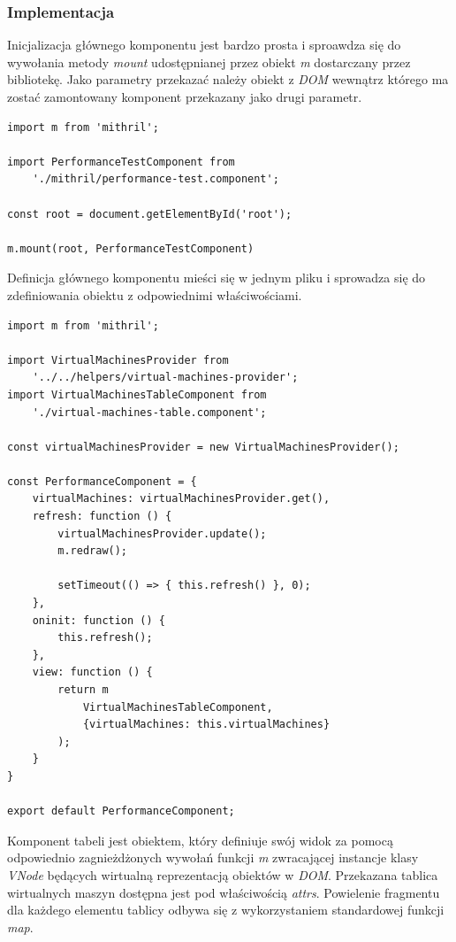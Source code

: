 \documentclass[polish, twoside, 12pt]{mwart}
\begin{document}
\subsubsection{Implementacja}

Inicjalizacja głównego komponentu jest bardzo prosta i sproawdza się do wywołania metody \emph{mount} udostępnianej przez obiekt \emph{m} dostarczany przez bibliotekę. Jako parametry przekazać należy obiekt z \emph{DOM} wewnątrz którego ma zostać zamontowany komponent przekazany jako drugi parametr.

\begin{lstlisting}[caption=Inicjalizacja głównego komponentu]
import m from 'mithril';

import PerformanceTestComponent from
    './mithril/performance-test.component';

const root = document.getElementById('root');

m.mount(root, PerformanceTestComponent)
\end{lstlisting}

Definicja głównego komponentu mieści się w jednym pliku i sprowadza się do zdefiniowania obiektu z odpowiednimi właściwościami.

\begin{lstlisting}[caption=Główny komponent]
import m from 'mithril';

import VirtualMachinesProvider from
    '../../helpers/virtual-machines-provider';
import VirtualMachinesTableComponent from
    './virtual-machines-table.component';

const virtualMachinesProvider = new VirtualMachinesProvider();

const PerformanceComponent = {
    virtualMachines: virtualMachinesProvider.get(),
    refresh: function () {
        virtualMachinesProvider.update();
        m.redraw();

        setTimeout(() => { this.refresh() }, 0);
    },
    oninit: function () {
        this.refresh();
    },
    view: function () {
        return m
            VirtualMachinesTableComponent,
            {virtualMachines: this.virtualMachines}
        );
    }
}

export default PerformanceComponent;
\end{lstlisting}

Komponent tabeli jest obiektem, który definiuje swój widok za pomocą odpowiednio zagnieżdżonych wywołań funkcji \emph{m} zwracającej instancje klasy \emph{VNode} będących wirtualną reprezentacją obiektów w \emph{DOM}. Przekazana tablica wirtualnych maszyn dostępna jest pod właściwością \emph{attrs}. Powielenie fragmentu dla każdego elementu tablicy odbywa się z wykorzystaniem standardowej funkcji \emph{map}.
\end{document}
